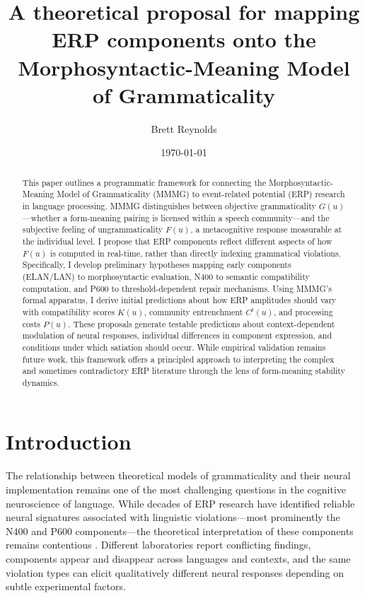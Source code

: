 \documentclass[12pt,letterpaper]{article}
\title{A theoretical proposal for mapping ERP components onto the Morphosyntactic-Meaning Model of Grammaticality}
\author{Brett Reynolds}
\date{\today}
\begin{document}
\maketitle

\begin{abstract}
This paper outlines a programmatic framework for connecting the Morphosyntactic-Meaning Model of Grammaticality (MMMG) to event-related potential (ERP) research in language processing. MMMG distinguishes between objective grammaticality $G(u)$—whether a form-meaning pairing is licensed within a speech community—and the subjective feeling of ungrammaticality $F(u)$, a metacognitive response measurable at the individual level. I propose that ERP components reflect different aspects of how $F(u)$ is computed in real-time, rather than directly indexing grammatical violations. Specifically, I develop preliminary hypotheses mapping early components (ELAN/LAN) to morphosyntactic evaluation, N400 to semantic compatibility computation, and P600 to threshold-dependent repair mechanisms. Using MMMG's formal apparatus, I derive initial predictions about how ERP amplitudes should vary with compatibility scores $K(u)$, community entrenchment $C^t(u)$, and processing costs $P(u)$. These proposals generate testable predictions about context-dependent modulation of neural responses, individual differences in component expression, and conditions under which satiation should occur. While empirical validation remains future work, this framework offers a principled approach to interpreting the complex and sometimes contradictory ERP literature through the lens of form-meaning stability dynamics.
\end{abstract}

\section{Introduction}
The relationship between theoretical models of grammaticality and their neural implementation remains one of the most challenging questions in the cognitive neuroscience of language. While decades of ERP research have identified reliable neural signatures associated with linguistic violations—most prominently the N400 and P600 components—the theoretical interpretation of these components remains contentious \autocite{Kuperberg2007, Brouwer2012, Leckey2020}. Different laboratories report conflicting findings, components appear and disappear across languages and contexts, and the same violation types can elicit qualitatively different neural responses depending on subtle experimental factors.
\end{document}
